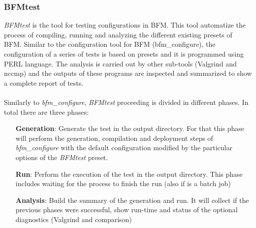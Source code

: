 \subsubsection{BFMtest}\label{subsubsec:soft_bfmtest}
{\it BFMtest} is the tool for testing configurations in BFM. This tool automatize the process of compiling, running and analyzing the different existing presets of BFM. Similar to the configuration tool for BFM (bfm\_configure), the configuration of a series of tests is based on presets and it is programmed using PERL\cite{perl.org} language. The analysis is carried out by other sub-tools (Valgrind\cite{valgrind} and nccmp\cite{nccmp}) and the outputs of these programs are inspected and summarized to show a complete report of tests.
\\\\
Similarly to {\it bfm\_configure}, {\it BFMtest} proceeding is divided in different phases. In total there are three phases:
\begin{itemize}
\item[{\bf Generation}:] Generate the test in the output directory. For that this phase will perform the generation, compilation and deployment steps of {\it bfm\_configure} with the default configuration modified by the particular options of the {\it BFMtest} preset.
\item[{\bf Run}:] Perform the execution of the test in the output directory. This phase includes waiting for the process to finish the run (also if is a batch job)  
\item[{\bf Analysis}:] Build the summary of the generation and run. It will collect if the previous phases were successful, show run-time and status of the optional diagnostics (Valgrind and comparison)  
\end{itemize}\bigskip

